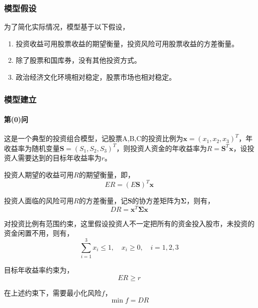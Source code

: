 \documentclass[12pt,a4paper]{article}
\begin{document}
\subsubsection{模型假设}

为了简化实际情况，模型基于以下假设，
\begin{enumerate}
    \item 投资收益可用股票收益的期望衡量，投资风险可用股票收益的方差衡量。
    \item 除了股票和国库券，没有其他投资方式。
    \item 政治经济文化环境相对稳定，股票市场也相对稳定。
\end{enumerate}

\subsubsection{模型建立}

\paragraph{第(0)问} 这是一个典型的投资组合模型，记股票A,B,C的投资比例为$\boldsymbol{x} = (x_1,x_2,x_3)^T$，年收益率为随机变量$\boldsymbol{S} = (S_1, S_2, S_3)^T$，则投资人资金的年收益率为$R = \boldsymbol{S}^T \boldsymbol{x}$，设投资人需要达到的目标年收益率为$r$。

投资人期望的收益可用$R$的期望衡量，即，
\begin{equation}
    ER = (E\boldsymbol{S})^T \boldsymbol{x}
\end{equation}

投资人面临的风险可用$R$的方差衡量，记$\boldsymbol{S}$的协方差矩阵为$\boldsymbol{\Sigma}$，则有，
\begin{equation}
    DR = \boldsymbol{x}^T \boldsymbol{\Sigma} \boldsymbol{x}
\end{equation}

对投资比例有范围约束，这里假设投资人不一定把所有的资金投入股市，未投资的资金闲置不用，则有，
\begin{equation}\label{eq:ex8_cons_range}
    \sum_{i=1}^3 x_i \le 1, \quad x_i \ge 0, \quad i = 1,2,3
\end{equation}

目标年收益率约束为，
\begin{equation}\label{eq:ex8_cons_profit}
    ER \ge r
\end{equation}

在上述约束下，需要最小化风险$f$，
\begin{equation}\label{eq:ex8_target}
    \min f = DR
\end{equation}
\end{document}
